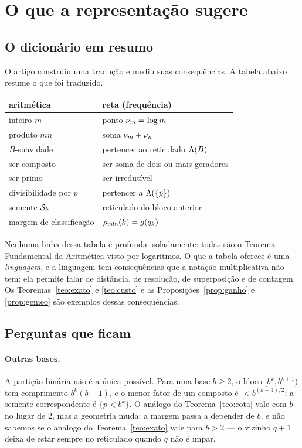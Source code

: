 \section{O que a representação sugere}\label{sec:perspectiva}

\subsection{O dicionário em resumo}

O artigo construiu uma tradução e mediu suas consequências. A tabela abaixo
resume o que foi traduzido.

\begin{center}
\small
\begin{tabular}{ll}
\toprule
aritmética & reta (frequência) \\
\midrule
inteiro $m$ & ponto $\nu_{m}=\log m$ \\
produto $mn$ & soma $\nu_{m}+\nu_{n}$ \\
$B$-suavidade & pertencer ao reticulado $\Lambda(B)$ \\
ser composto & ser soma de dois ou mais geradores \\
ser primo & ser irredutível \\
divisibilidade por $p$ & pertencer a $\Lambda(\{p\})$ \\
semente $\mathcal{S}_k$ & reticulado do bloco anterior \\
margem de classificação & $\rho_{\min}(k)=g(q_k)$ \\
\bottomrule
\end{tabular}
\end{center}

Nenhuma linha dessa tabela é profunda isoladamente: todas são o Teorema
Fundamental da Aritmética visto por logaritmos. O que a tabela oferece é uma
\emph{linguagem}, e a linguagem tem consequências que a notação multiplicativa não
tem: ela permite falar de distância, de resolução, de superposição e de contagem.
Os Teoremas~\ref{teo:exato} e \ref{teo:custo} e as
Proposições~\ref{prop:ganho} e \ref{prop:gemeo} são exemplos dessas consequências.

\subsection{Perguntas que ficam}

\paragraph{Outras bases.} A partição binária não é a única possível. Para uma base
$b\ge2$, o bloco $[b^k,b^{k+1})$ tem comprimento $b^k(b-1)$, e o menor fator de um
composto é $<b^{(k+1)/2}$; a semente correspondente é $\{p<b^k\}$. O análogo do
Teorema~\ref{teo:cota} vale com $b$ no lugar de $2$, mas a geometria muda: a
margem passa a depender de $b$, e não sabemos se o análogo do
Teorema~\ref{teo:exato} vale para $b>2$ — o vizinho $q+1$ deixa de estar sempre no
reticulado quando $q$ não é ímpar.

